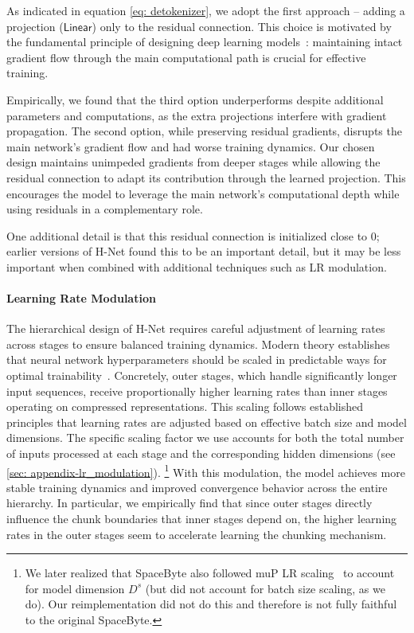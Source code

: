 \documentclass{article}
\newcommand{\citep}{\parencite}
\newcommand{\main}{main network}
\theoremstyle{plain}
\theoremstyle{remark}
\begin{document}
As indicated in equation \eqref{eq: detokenizer}, we adopt the first approach -- adding a projection ($\mathsf{Linear}$) only to the residual connection.
This choice is motivated by the fundamental principle of designing deep learning models~\citep{ResNet}: maintaining intact gradient flow through the main computational path is crucial for effective training.

Empirically, we found that the third option underperforms despite additional parameters and computations, as the extra projections interfere with gradient propagation.
The second option, while preserving residual gradients, disrupts the main network's gradient flow and had worse training dynamics.
Our chosen design maintains unimpeded gradients from deeper stages while allowing the residual connection to adapt its contribution through the learned projection.
This encourages the model to leverage the \main{}'s computational depth while using residuals in a complementary role.

One additional detail is that this residual connection is initialized close to 0; earlier versions of H-Net found this to be an important detail, but it may be less important when combined with additional techniques such as LR modulation.

\paragraph{Learning Rate Modulation}
The hierarchical design of H-Net requires careful adjustment of learning rates across stages to ensure balanced training dynamics.
Modern theory establishes that neural network hyperparameters should be scaled in predictable ways for optimal trainability~\citep{yang2020feature}.
Concretely, outer stages, which handle significantly longer input sequences, receive proportionally higher learning rates than inner stages operating on compressed representations.
This scaling follows established principles that learning rates are adjusted based on effective batch size and model dimensions.
The specific scaling factor we use accounts for both the total number of inputs processed at each stage and the corresponding hidden dimensions (see \cref{sec: appendix-lr_modulation}).
\footnote{We later realized that SpaceByte also followed muP LR scaling~\citep{yang2020feature} to account for model dimension $D^s$ \citep[Appendix B.2]{SpaceByte} (but did not account for batch size scaling, as we do). Our reimplementation did not do this and therefore is not fully faithful to the original SpaceByte.}
With this modulation, the model achieves more stable training dynamics and improved convergence behavior across the entire hierarchy.
In particular, we empirically find that since outer stages directly influence the chunk boundaries that inner stages depend on, the higher learning rates in the outer stages seem to accelerate learning the chunking mechanism.
\end{document}
